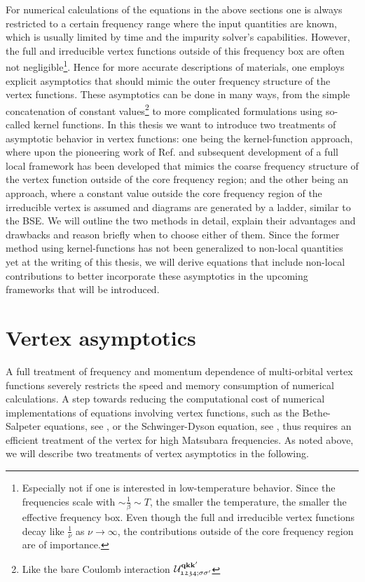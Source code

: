 \documentclass[../../main.tex]{subfiles}
\begin{document}
For numerical calculations of the equations in the above sections one is always restricted to a certain frequency range where the input quantities are known, which is usually limited by time and the impurity solver's capabilities. However, the full and irreducible vertex functions outside of this  frequency box are often not negligible\footnote{Especially not if one is interested in low-temperature behavior. Since the frequencies scale with $\sim\frac1\beta\sim T$, the smaller the temperature, the smaller the effective frequency box. Even though the full and irreducible vertex functions decay like $\frac{1}{\nu}$ as $\nu\to\infty$, the contributions outside of the core frequency region are of importance.}. Hence for more accurate descriptions of materials, one employs explicit asymptotics that should mimic the outer frequency structure of the vertex functions. These asymptotics can be done in many ways, from the simple concatenation of constant values\footnote{Like the bare Coulomb interaction $\mathcal{U}^{\textbf{qkk}'}_{\mathfrak{1234};\sigma\sigma'}$} to more complicated formulations using so-called kernel functions. In this thesis we want to introduce two treatments of asymptotic behavior in vertex functions: one being the kernel-function approach, where upon the pioneering work of Ref. \cite{kunes} and subsequent development of a full local framework \cite{wentzell, tagliavini, hummel, qmc asympt, kaufmann da} has been developed that mimics the coarse frequency structure of the vertex function outside of the core frequency region; and the other being an  approach, where a constant value outside the core frequency region of the irreducible vertex is assumed and diagrams are generated by a ladder, similar to the BSE. We will outline the two methods in detail, explain their advantages and drawbacks and reason briefly when to choose either of them. Since the former method using kernel-functions has not been generalized to non-local quantities yet at the writing of this thesis, we will derive equations that include non-local contributions to better incorporate these asymptotics in the upcoming frameworks that will be introduced. 

\section{Vertex asymptotics}\label{sec:vertex_asymptotics}

A full treatment of frequency and momentum dependence of multi-orbital vertex functions severely restricts the speed and memory consumption of numerical calculations. A step towards reducing the computational cost of numerical implementations of equations involving vertex functions, such as the Bethe-Salpeter equations, see , or the Schwinger-Dyson equation, see , thus requires an efficient treatment of the vertex for high Matsubara frequencies. As noted above, we will describe two treatments of vertex asymptotics in the following.
\end{document}
